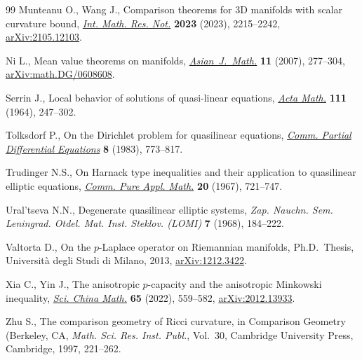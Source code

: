 \documentclass[11pt]{article}
\numberwithin{equation}{section}
\numberwithin{equation}{section}
\begin{document}
\begin{thebibliography}{99}
Munteanu O., Wang J., Comparison theorems for 3{D} manifolds with scalar
 curvature bound, \href{https://doi.org/10.1093/imrn/rnab307}{\textit{Int. Math. Res. Not.}} \textbf{2023} (2023),
 2215--2242, \href{https://arxiv.org/abs/2105.12103}{arXiv:2105.12103}.

Ni L., Mean value theorems on manifolds, \href{https://doi.org/10.4310/AJM.2007.v11.n2.a6}{\textit{Asian~J.~Math.}} \textbf{11}
 (2007), 277--304, \href{https://arxiv.org/abs/math.DG/0608608}{arXiv:math.DG/0608608}.

Serrin J., Local behavior of solutions of quasi-linear equations, \href{https://doi.org/10.1007/BF02391014}{\textit{Acta
 Math.}} \textbf{111} (1964), 247--302.

Tolksdorf P., On the {D}irichlet problem for quasilinear equations,
 \href{https://doi.org/10.1080/03605308308820285}{\textit{Comm. Partial Differential Equations}} \textbf{8} (1983), 773--817.

Trudinger N.S., On {H}arnack type inequalities and their application to
 quasilinear elliptic equations, \href{https://doi.org/10.1002/cpa.3160200406}{\textit{Comm. Pure Appl. Math.}} \textbf{20}
 (1967), 721--747.

Ural'tseva N.N., Degenerate quasilinear elliptic systems, \textit{Zap. Nauchn.
 Sem. Leningrad. Otdel. Mat. Inst. Steklov. (LOMI)} \textbf{7} (1968),
 184--222.

Valtorta D., On the $p$-{L}aplace operator on {R}iemannian manifolds, Ph.D.~Thesis, {U}niversit\`a degli Studi di Milano, 2013, \href{https://arxiv.org/abs/1212.3422}{arXiv:1212.3422}.

Xia C., Yin J., The anisotropic {$p$}-capacity and the anisotropic {M}inkowski
 inequality, \href{https://doi.org/10.1007/s11425-021-1884-1}{\textit{Sci. China Math.}} \textbf{65} (2022), 559--582,
 \href{https://arxiv.org/abs/2012.13933}{arXiv:2012.13933}.

Zhu S., The comparison geometry of {R}icci curvature, in Comparison {G}eometry
 ({B}erkeley, {CA}, \textit{Math. Sci. Res. Inst. Publ.}, Vol.~30, Cambridge
 University Press, Cambridge, 1997, 221--262.

\end{thebibliography}
\end{document}
